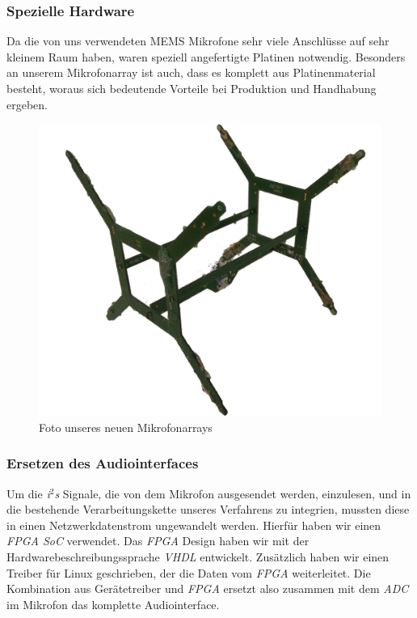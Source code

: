 \documentclass[german,10pt,a4paper,notitlepage,twocolumn]{article}
\begin{document}
\subsubsection*{Spezielle Hardware}
Da die von uns verwendeten MEMS Mikrofone sehr viele Anschlüsse auf sehr kleinem Raum haben, waren speziell angefertigte Platinen notwendig. Besonders an unserem Mikrofonarray ist auch, dass es komplett aus Platinenmaterial besteht, woraus sich bedeutende Vorteile bei Produktion und Handhabung ergeben.
\begin{figure}[H]
    \centering
    \includegraphics[width=\linewidth]{img/cube}
    \vspace{-2em}
    \caption{Foto unseres neuen Mikrofonarrays}
    \label{fig:cube}
\end{figure}
\subsubsection*{Ersetzen des Audiointerfaces}
Um die \textit{i$^2$s} Signale, die von dem Mikrofon ausgesendet werden, einzulesen, und in die bestehende Verarbeitungskette unseres Verfahrens zu integrien, mussten diese in einen Netzwerkdatenstrom ungewandelt werden. Hierfür haben wir einen \textit{FPGA SoC} verwendet. Das \textit{FPGA} Design haben wir mit der Hardwarebeschreibungssprache \textit{VHDL} entwickelt. Zusätzlich haben wir einen Treiber für Linux geschrieben, der die Daten vom \textit{FPGA} weiterleitet. Die Kombination aus Gerätetreiber und \textit{FPGA} ersetzt also zusammen mit dem \textit{ADC} im Mikrofon das komplette Audiointerface.
\end{document}
